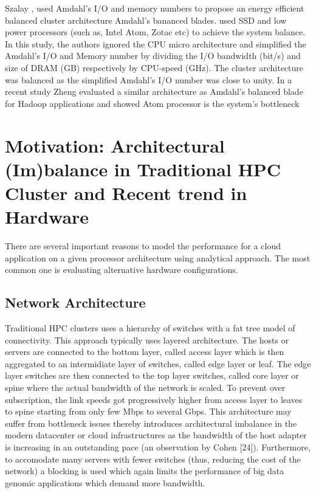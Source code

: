 \documentclass[journal]{IEEEtran}
\begin{document}
Szalay \cite{cluster:AmdahlBalancedBlade}, used Amdahl's I/O and memory numbers to propose an energy efficient balanced cluster architecture Amdahl’s bananced blades. \cite{cluster:AmdahlBalancedBlade} used SSD and low power processors (such as, Intel Atom, Zotac etc) to achieve the system balance. In this study, the authors ignored the CPU micro architecture and simplified the Amdahl's I/O and Memory number by dividing the I/O bandwidth (bit/s) and size of DRAM (GB) respectively by CPU-speed (GHz). The cluster architecture was balanced as the simplified Amdahl's I/O number was close to unity. In a recent study \cite{Balance:zheng2014hadoop} Zheng evaluated a similar architecture as Amdahl's balanced blade for Hadoop applications and showed Atom processor is the system's bottleneck  %

\section{Motivation: Architectural (Im)balance in Traditional HPC Cluster and Recent trend in Hardware}
There are several important reasons to model the performance for a cloud application on a given processor architecture using analytical approach. The most common one is evaluating alternative hardware configurations.
\subsection{Network Architecture}
Traditional HPC clusters uses a hierarchy of switches with a fat tree model of connectivity. This approach typically uses layered architecture. The hosts or servers are connected to the bottom layer, called access layer which is then aggregated to an intermidiate layer of switches, called edge layer or leaf. The edge layer switches are then connected to the top layer switches, called core layer or spine where the actual bandwidth of the network is scaled. To prevent over subscription, the link speeds got progressively higher from access layer to leaves to spine starting from only few Mbps to several Gbps. This architecture may suffer from bottleneck issues thereby introduces architectural imbalance in the modern datacenter or cloud infrastructures as the bandwidth of the host adapter is increasing in an outstanding pace (an observation by Cohen [24]). Furthermore, to accomodate many servers with fewer switches (thus, reducing the cost of the network) a blocking is used which again limits the performance of big data genomic applications which demand more bandwidth.
\end{document}
